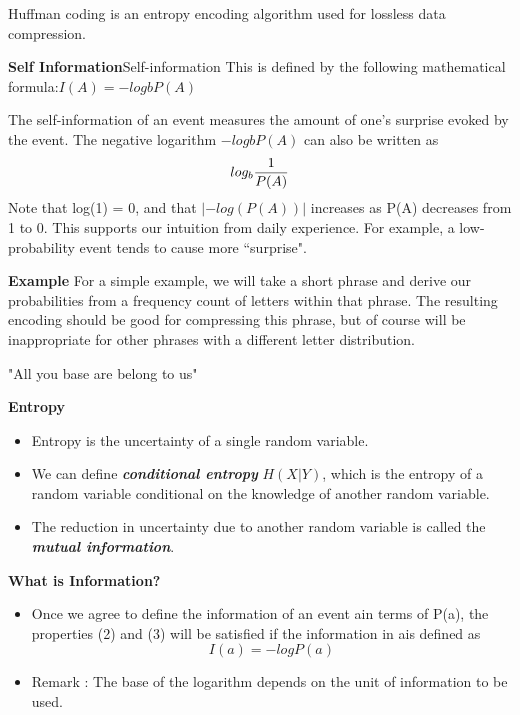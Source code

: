 

{
Huffman coding is an entropy encoding algorithm used for lossless data compression.


}

\noindent \textbf{Self Information}Self-information
This is defined by the following mathematical formula:$I(A) = −logb P(A)$

The self-information of an event measures the amount of one's surprise
evoked by the event. The negative logarithm $−logb P(A)$ can also be written as \[
log_b  {1 \over P(A)} \]
Note that log(1) = 0, and that $| − log(P(A))|$ increases as P(A) decreases
from 1 to 0. This supports our intuition from daily experience. For example,
a low-probability event tends to cause more ``surprise".



{
\noindent \textbf{Example}
For a simple example, we will take a short phrase and derive our probabilities from a frequency count of letters within that phrase. The resulting encoding should be good for compressing this phrase, but of course will be inappropriate for other phrases with a different letter distribution.

"All you base are belong to us"
}


{
\noindent \textbf{Entropy}
\begin{itemize}
\item Entropy is the uncertainty of a single random variable. \item We can define \textbf{\emph{conditional entropy }}$H(X|Y)$, which is the entropy of a random variable
conditional on the knowledge of another random variable. \item The reduction in uncertainty due to another random variable is called the \textbf{\emph{mutual information}}.
\end{itemize}
}




{
\noindent \textbf{What is Information?}
\begin{itemize} \item Once we agree to define the information of an event ain terms of P(a), the properties (2) and (3) will be satisfied if the information in ais defined as
\[ I(a) = -log P(a)\]

\item Remark : The base of the logarithm depends on the unit of information to be used.
\end{itemize}
}



